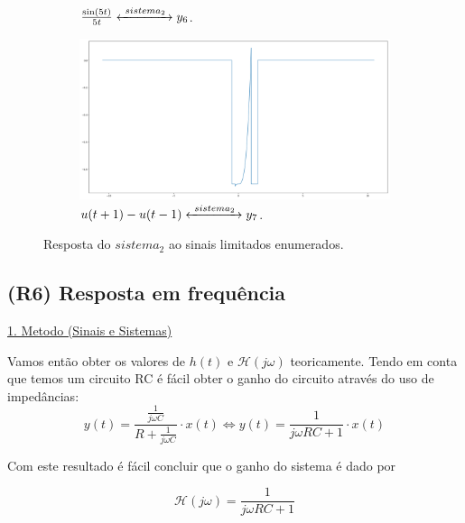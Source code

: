 \begin{figure}[H]
\begin{subfigure}[b]{0.5\linewidth}
        \caption{\( \frac{\sin(5t)}{5t} \xleftrightarrow[]{\ sistema_2\ } y_6\).} 
        \label{fig:exemplo6} 
    \end{subfigure} 
    \begin{subfigure}[b]{0.5\linewidth}
        \centering
        \includegraphics[width=1\linewidth]{prints/exemplo_7.png} 
        \caption{\( u(t+1)-u(t-1) \xleftrightarrow[]{\ sistema_2\ } y_7\).} 
        \label{fig:exemplo7} 
    \end{subfigure} 
    \centering
    \caption{Resposta do \(sistema_2\) ao sinais limitados enumerados.}
    \label{fig:appendix_A.2}
\end{figure}

\clearpage
\subsection{(R6) Resposta em frequência} %

\begin{normalsize}
\underline{1. Metodo (Sinais e Sistemas)} 
\vspace{0.25cm}
\end{normalsize}

Vamos então obter os valores de \(h(t)\) e \(\mathcal{H}(j\omega)\) teoricamente.
Tendo em conta que temos um circuito RC é fácil obter o ganho do circuito através do uso de impedâncias:
\[ y(t) = \frac{\frac{1}{j\omega C}}{R + \frac{1}{j\omega C}} \cdot x(t) \iff y(t) = \frac{1}{j\omega RC + 1} \cdot x(t) \]

Com este resultado é fácil concluir que o ganho do sistema é dado por

\[ \mathcal{H}(j\omega) = \frac{1}{j\omega RC+1} \]

